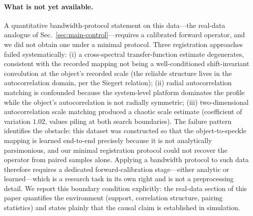 \paragraph{What is not yet available.} A quantitative bandwidth-protocol statement on this data---the real-data analogue of Sec.~\ref{sec:main-control}---requires a calibrated forward operator, and we did not obtain one under a minimal protocol. Three registration approaches failed systematically: (i) a cross-spectral transfer-function estimate degenerates, consistent with the recorded mapping not being a well-conditioned shift-invariant convolution at the object's recorded scale (the reliable structure lives in the autocorrelation domain, per the Siegert relation); (ii) radial autocorrelation matching is confounded because the system-level platform dominates the profile while the object's autocorrelation is not radially symmetric; (iii) two-dimensional autocorrelation scale matching produced a chaotic scale estimate (coefficient of variation $1.02$, values piling at both search boundaries). The failure pattern identifies the obstacle: this dataset was constructed so that the object-to-speckle mapping is learned end-to-end precisely because it is not analytically parsimonious, and our minimal registration protocol could not recover the operator from paired samples alone. Applying a bandwidth protocol to such data therefore requires a dedicated forward-calibration stage---either analytic or learned---which is a research task in its own right and is not a preprocessing detail. We report this boundary condition explicitly: the real-data section of this paper quantifies the environment (support, correlation structure, pairing statistics) and states plainly that the causal claim is established in simulation.

